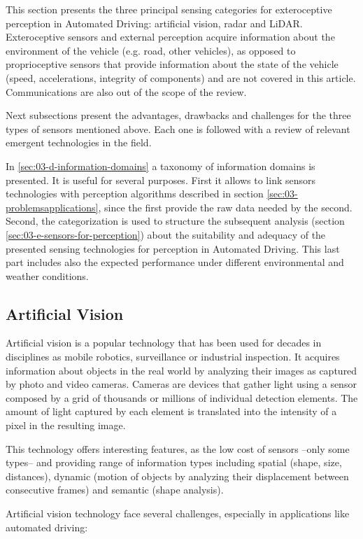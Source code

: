 
This section presents the three principal sensing categories for exteroceptive
perception in Automated Driving: artificial vision, radar and LiDAR.
Exteroceptive sensors and external perception acquire information about the
environment of the vehicle (e.g. road, other vehicles), as opposed to 
proprioceptive sensors that provide information about the state of the vehicle
(speed, accelerations, integrity of components) and are not covered in this 
article. Communications are also out of the scope of the review. 

Next subsections present the advantages, drawbacks and challenges for the three 
types of sensors mentioned above. Each one is followed with a review of
relevant emergent technologies in the field.

In \ref{sec:03-d-information-domains} a taxonomy of information domains is
presented. It is useful for several purposes. First it allows to 
link sensors technologies with perception algorithms described in section
\ref{sec:03-problemsapplications}, since the first provide the raw data needed
by the second. Second, the categorization is used to structure the subsequent
analysis (section \ref{sec:03-e-sensors-for-perception}) about the suitability
and adequacy of the presented sensing technologies for perception in Automated
Driving. This last part includes also the expected performance under different
environmental and weather conditions.

\subsection{Artificial Vision}
Artificial vision is a popular technology that has been used for decades in 
disciplines as mobile robotics, surveillance or industrial inspection. It acquires
information about objects in the real world by analyzing their images as 
captured by photo and video cameras. Cameras are devices that gather light using
a sensor composed by a grid of thousands or millions of individual detection 
elements. The amount of light captured by each element is translated into the
intensity of a pixel in the resulting image. 

This technology offers interesting features, as the low cost of sensors --only 
some types-- and providing range of information types including spatial
(shape, size, distances), dynamic (motion of objects by analyzing their 
displacement between consecutive frames) and semantic (shape analysis).

Artificial vision technology face several challenges, especially in 
applications like automated driving:

